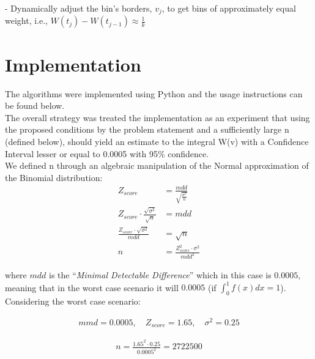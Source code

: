 \documentclass[12pt]{article}
\begin{document}
- Dynamically adjust the bin's borders, $v_j$, to get bins of approximately
equal weight, i.e., $W(t_j) - W(t_{j-1}) \approx \frac{1}{k}$

\section*{Implementation}

The algorithms were implemented using Python and the usage instructions can be found below. \\
The overall strategy was treated the implementation as an experiment that using the proposed conditions by the problem statement and a sufficiently large n (defined below), should yield an estimate to the integral W(v) with a Confidence Interval lesser or equal to 0.0005 with 95\% confidence.\\
We defined n through an algebraic manipulation of the Normal approximation of the Binomial distribution:
\begin{align}
Z_{score} & = \frac{mdd}{\sqrt{\frac{\sigma^{2}}{n}}}\nonumber\\
Z_{score}\cdot\frac{\sqrt{\sigma^{2}}}{\sqrt{n}} & = mdd\nonumber\\
\frac{Z_{score}\cdot\sqrt{\sigma^{2}}}{mdd} & = \sqrt{n}\nonumber\\
n &= \frac{Z_{score}^{2}\cdot\sigma^{2}}{mdd^{2}}
\end{align}

where $mdd$ is the ``\textit{Minimal Detectable Difference}'' which in this case is $0.0005$, meaning that in the worst case scenario it will $0.0005$ (if $\int_{0}^{1}f(x)dx=1$). Considering the worst case scenario:

\begin{eqnarray}
mmd = 0.0005,\quad Z_{score} = 1.65,\quad \sigma^{2} = 0.25
\end{eqnarray}

\begin{eqnarray}
n = \frac{1.65^{2} \cdot 0.25}{0.0005^{2}} = 2722500
\end{eqnarray}
\end{document}
